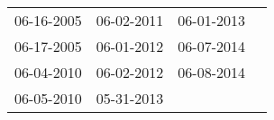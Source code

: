 \begin{supertabular}{llll}
 06-16-2005 &  06-02-2011 &  06-01-2013 \\
 06-17-2005 &  06-01-2012 &  06-07-2014 \\
 06-04-2010 &  06-02-2012 &  06-08-2014 \\
 06-05-2010 &  05-31-2013 &             \\
\end{supertabular}
